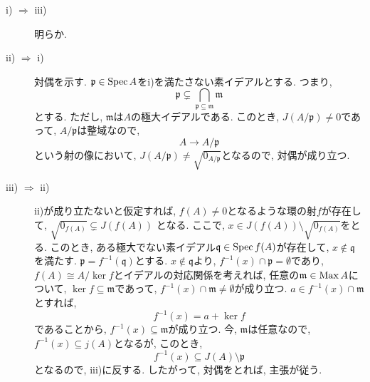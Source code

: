 \documentclass[dvipdfmx]{jsarticle}
\begin{document}
    \begin{problem}
        \begin{description}
            \item[i) $\Rightarrow$ iii)] 明らか.
            \item[ii) $\Rightarrow$ i)] 対偶を示す.
            $\mathfrak{p} \in \operatorname{Spec}{A}$をi)を満たさない素イデアルとする.
            つまり,
            \[
                \mathfrak{p} \subsetneq \bigcap_{\mathfrak{p} \subseteq \mathfrak{m}} \mathfrak{m}
            \]
            とする.
            ただし, $\mathfrak{m}$は$A$の極大イデアルである.
            このとき, $J(A/\mathfrak{p}) \neq 0$であって, $A/\mathfrak{p}$は整域なので,
            \[
                A \longrightarrow  A/\mathfrak{p}
            \]
            という射の像において, $J(A/\mathfrak{p}) \neq \sqrt{0_{A/\mathfrak{p}}}$となるので, 対偶が成り立つ.
            \item[iii) $\Rightarrow$ ii)]
            ii)が成り立たないと仮定すれば, $f(A) \neq 0$となるような環の射$f$が存在して,
            $\sqrt{0_{f(A)}} \subsetneq J(f(A))$
            となる.
            ここで, $x \in J(f(A)) \setminus \sqrt{0_{f(A)}}$をとる.
            このとき, ある極大でない素イデアル$\mathfrak{q} \in \operatorname{Spec}{f(A)}$が存在して,
            $x \notin \mathfrak{q}$を満たす.
            $\mathfrak{p} = f^{-1}(\mathfrak{q})$とする.
            $x \notin \mathfrak{q}$より, $f^{-1}(x) \cap \mathfrak{p} = \emptyset$であり,
            $f(A) \cong A/\ker{f}$とイデアルの対応関係を考えれば,
            任意の$\mathfrak{m} \in \operatorname{Max}{A}$について,
            $\ker{f} \subseteq \mathfrak{m}$であって,
            $f^{-1}(x) \cap \mathfrak{m} \neq \emptyset$が成り立つ.
            $a \in f^{-1}(x) \cap \mathfrak{m}$とすれば,
            \[
                f^{-1}(x) = a + \ker{f}
            \]
            であることから,
            $f^{-1}(x) \subseteq \mathfrak{m}$が成り立つ.
            今, $\mathfrak{m}$は任意なので,
            $f^{-1}(x) \subseteq j(A)$となるが,
            このとき,
            \[
                f^{-1}(x) \subseteq J(A) \setminus \mathfrak{p}
            \]
            となるので, iii)に反する.
            したがって, 対偶をとれば, 主張が従う.
        \end{description}
    \end{problem}
\end{document}
